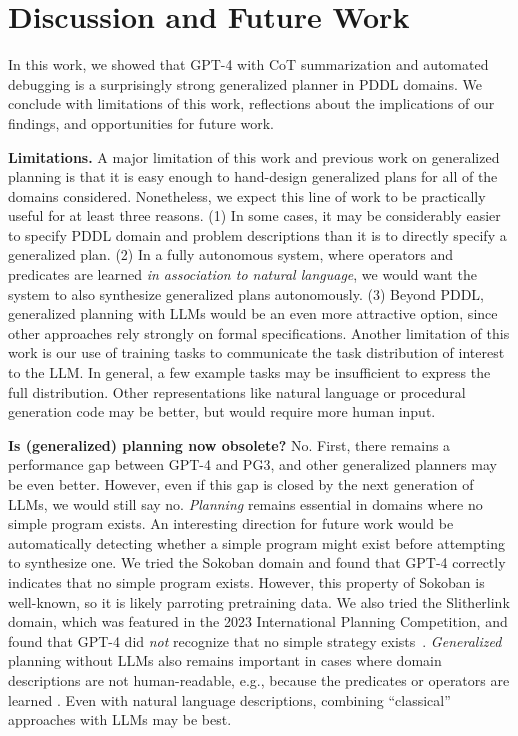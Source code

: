 \documentclass[letterpaper]{article} %
\begin{document}
\section{Discussion and Future Work}

In this work, we showed that GPT-4 with CoT summarization and automated debugging is a surprisingly strong generalized planner in PDDL domains.
We conclude with limitations of this work, reflections about the implications of our findings, and opportunities for future work.

\textbf{Limitations.}
A major limitation of this work and previous work on generalized planning is that it is easy enough to hand-design generalized plans for all of the domains considered.
Nonetheless, we expect this line of work to be practically useful for at least three reasons.
(1) In some cases, it may be considerably easier to specify PDDL domain and problem descriptions than it is to directly specify a generalized plan.
(2) In a fully autonomous system, where operators and predicates are learned \emph{in association to natural language}, we would want the system to also synthesize generalized plans autonomously.
(3) Beyond PDDL, generalized planning with LLMs would be an even more attractive option, since other approaches rely strongly on formal specifications.
Another limitation of this work is our use of training tasks to communicate the task distribution of interest to the LLM.
In general, a few example tasks may be insufficient to express the full distribution.
Other representations like natural language or procedural generation code may be better, but would require more human input.

\textbf{Is (generalized) planning now obsolete?}
No.
First, there remains a performance gap between GPT-4 and PG3, and other generalized planners may be even better.
However, even if this gap is closed by the next generation of LLMs, we would still say no.
\emph{Planning} remains essential in domains where no simple program exists.
An interesting direction for future work would be automatically detecting whether a simple program might exist before attempting to synthesize one.
We tried the Sokoban domain and found that GPT-4 correctly indicates that no simple program exists.
However, this property of Sokoban is well-known, so it is likely parroting pretraining data.
We also tried the Slitherlink domain, which was featured in the 2023 International Planning Competition, and found that GPT-4 did \emph{not} recognize that no simple strategy exists~\cite{Yato2003OnTN}.
\emph{Generalized} planning without LLMs also remains important in cases where domain descriptions are not human-readable, e.g., because the predicates or operators are learned 
\cite{silver2023inventing}.
Even with natural language descriptions, combining ``classical'' approaches with LLMs may be best.
\end{document}
